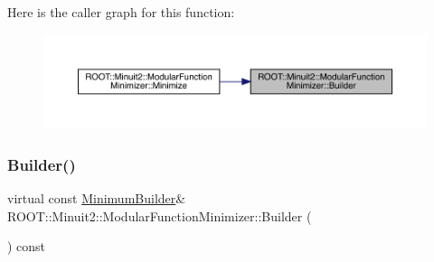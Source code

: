 Here is the caller graph for this function\+:\nopagebreak
\begin{figure}[H]
\begin{center}
\leavevmode
\includegraphics[width=350pt]{d3/dc8/classROOT_1_1Minuit2_1_1ModularFunctionMinimizer_a13e98551cf14e927c61e1e34ecf8ba8b_icgraph}
\end{center}
\end{figure}
\mbox{\label{classROOT_1_1Minuit2_1_1ModularFunctionMinimizer_a13e98551cf14e927c61e1e34ecf8ba8b}} 
\subsubsection{\texorpdfstring{Builder()}{Builder()}\hspace{0.1cm}{\footnotesize\ttfamily [2/2]}}
{\footnotesize\ttfamily virtual const \mbox{\hyperlink{classROOT_1_1Minuit2_1_1MinimumBuilder}{Minimum\+Builder}}\& R\+O\+O\+T\+::\+Minuit2\+::\+Modular\+Function\+Minimizer\+::\+Builder (\begin{DoxyParamCaption}{ }\end{DoxyParamCaption}) const\hspace{0.3cm}{\ttfamily [pure virtual]}}



